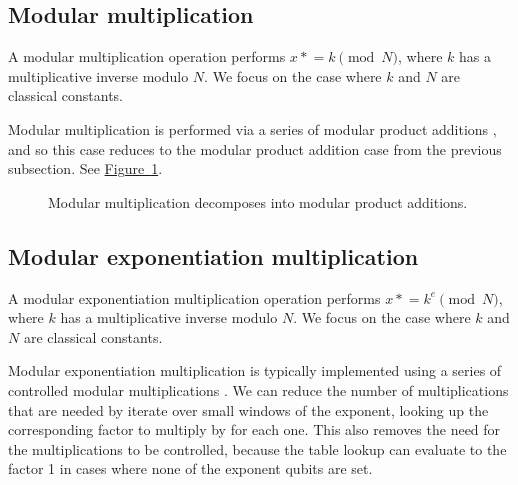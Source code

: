 \documentclass[onecolumn,unpublished]{quantumarticle}
\theoremstyle{definition}
\theoremstyle{definition}
\theoremstyle{definition}
\newcommand{\fig}[1]{\hyperref[fig:#1]{Figure~\ref*{fig:#1}}}
\newcommand{\timeseq}{\mathrel{\ast}=}
\begin{document}
\subsection{Modular multiplication}

A modular multiplication operation performs $x \timeseq k \pmod{N}$, where $k$ has a multiplicative inverse modulo $N$.
We focus on the case where $k$ and $N$ are classical constants.

Modular multiplication is performed via a series of modular product additions \cite{zalka2006pure, haner2016factoring, gidney2017factoring}, and so this case reduces to the modular product addition case from the previous subsection.
See \fig{multiply}.

\begin{figure}
\centering
{}
    \caption{
        \label{fig:multiply}
        Modular multiplication decomposes into modular product additions.
    }
\end{figure}


\subsection{Modular exponentiation multiplication}

A modular exponentiation multiplication operation performs $x \timeseq k^e \pmod{N}$, where $k$ has a multiplicative inverse modulo $N$.
We focus on the case where $k$ and $N$ are classical constants.

Modular exponentiation multiplication is typically implemented using a series of controlled modular multiplications \cite{vedral1996arithmetic,zalka1998fast,haner2016factoring,gidney2017factoring}.
We can reduce the number of multiplications that are needed by iterate over small windows of the exponent, looking up the corresponding factor to multiply by for each one.
This also removes the need for the multiplications to be controlled, because the table lookup can evaluate to the factor 1 in cases where none of the exponent qubits are set.
\end{document}
